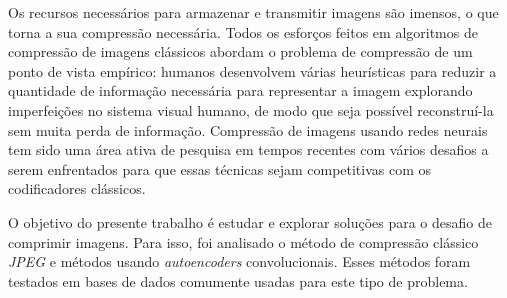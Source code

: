 

Os recursos necessários para armazenar e transmitir imagens são imensos, o que torna a sua compressão necessária. Todos os esforços feitos em algoritmos de compressão de imagens clássicos abordam o problema de compressão de um ponto de vista empírico: humanos desenvolvem várias heurísticas para reduzir a quantidade de informação necessária para representar a imagem explorando imperfeições no sistema visual humano, de modo que seja possível reconstruí-la sem muita perda de informação. Compressão de imagens usando redes neurais tem sido uma área ativa de pesquisa em tempos recentes com vários desafios a serem enfrentados para que essas técnicas sejam competitivas com os codificadores clássicos.

O objetivo do presente trabalho é estudar e explorar soluções para o desafio de comprimir imagens. Para isso, foi analisado o método de compressão clássico \textit{JPEG} e métodos usando \textit{autoencoders} convolucionais. Esses métodos foram testados em bases de dados comumente usadas para este tipo de problema. 


